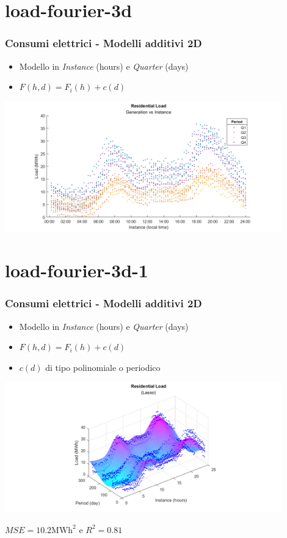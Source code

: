 \documentclass{beamer}
\begin{document}
\section{load-fourier-3d}
\begin{frame}
    \frametitle{Consumi elettrici - Modelli additivi 2D}   
    \begin{itemize}
        \item Modello in \textit{Instance} (hours) e \textit{Quarter} (days)
        \item $F(h, d)=F_i(h)+c(d)$
    \end{itemize}
    \vspace{1cm} %
    \vfill
    
    \centering
    \includegraphics[width=0.9\textwidth,keepaspectratio]{all_residenzial_load_period.png} 
\end{frame}

\section{load-fourier-3d-1}
\begin{frame}
    \frametitle{Consumi elettrici - Modelli additivi 2D}   
    \begin{itemize}
        \item Modello in \textit{Instance} (hours) e \textit{Quarter} (days)
        \item $F(h, d)=F_i(h)+c(d)$
        \item $c(d)$ di tipo polinomiale o periodico
    \end{itemize}
    \vfill
    \centering
    \includegraphics[width=0.9\textwidth,keepaspectratio]{all_residential_load_lasso_const_f.png} 
    
    \scriptsize $MSE=10.2\text{MWh}^2$ e $R^2=0.81$
\end{frame}
\end{document}
